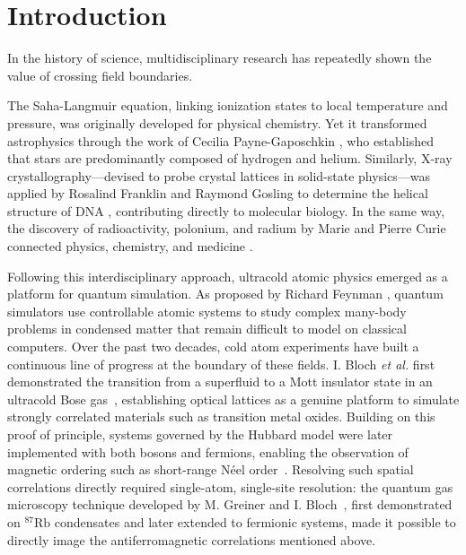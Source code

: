 \chapter*{Introduction}

In the history of science, multidisciplinary research has repeatedly shown the value of crossing field boundaries.

The Saha-Langmuir equation, linking ionization states to local temperature and pressure, was originally developed for physical chemistry. Yet it transformed astrophysics through the work of Cecilia Payne-Gaposchkin \cite{Payne1925StellarAtmospheres}, who established that stars are predominantly composed of hydrogen and helium. Similarly, X-ray crystallography—devised to probe crystal lattices in solid-state physics—was applied by Rosalind Franklin and Raymond Gosling to determine the helical structure of DNA \cite{Franklin1953MolecularConfiguration}, contributing directly to molecular biology. In the same way, the discovery of radioactivity, polonium, and radium by Marie and Pierre Curie connected physics, chemistry, and medicine \cite{Borde2017Metrologie}.

Following this interdisciplinary approach, ultracold atomic physics emerged as a platform for quantum simulation. As proposed by Richard Feynman \cite{Feynman1982Simulating}, quantum simulators use controllable atomic systems to study complex many-body problems in condensed matter that remain difficult to model on classical computers. Over the past two decades, cold atom experiments have built a continuous line of progress at the boundary of these fields. I. Bloch \textit{et al.} first demonstrated the transition from a superfluid to a Mott insulator state in an ultracold Bose gas~\cite{Greiner2002MottInsulator}, establishing optical lattices as a genuine platform to simulate strongly correlated materials such as transition metal oxides. Building on this proof of principle, systems governed by the Hubbard model were later implemented with both bosons and fermions, enabling the observation of magnetic ordering such as short-range Néel order~\cite{Mazurenko2017a, Sun2021BosonicAntiferromagnet}. Resolving such spatial correlations directly required single-atom, single-site resolution: the quantum gas microscopy technique developed by M. Greiner and I. Bloch~\cite{Bakr2009QuantumGasMicroscope}, first demonstrated on $^{87}\text{Rb}$ condensates and later extended to fermionic systems, made it possible to directly image the antiferromagnetic correlations mentioned above.

